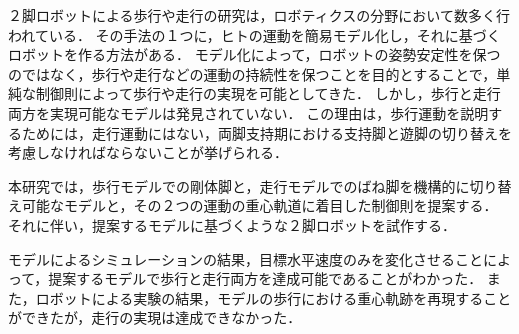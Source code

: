 ２脚ロボットによる歩行や走行の研究は，ロボティクスの分野において数多く行われている．
その手法の１つに，ヒトの運動を簡易モデル化し，それに基づくロボットを作る方法がある．
モデル化によって，ロボットの姿勢安定性を保つのではなく，歩行や走行などの運動の持続性を保つことを目的とすることで，単純な制御則によって歩行や走行の実現を可能としてきた．
しかし，歩行と走行両方を実現可能なモデルは発見されていない．
この理由は，歩行運動を説明するためには，走行運動にはない，両脚支持期における支持脚と遊脚の切り替えを考慮しなければならないことが挙げられる．

本研究では，歩行モデルでの剛体脚と，走行モデルでのばね脚を機構的に切り替え可能なモデルと，その２つの運動の重心軌道に着目した制御則を提案する．
それに伴い，提案するモデルに基づくような２脚ロボットを試作する．


モデルによるシミュレーションの結果，目標水平速度のみを変化させることによって，提案するモデルで歩行と走行両方を達成可能であることがわかった．
また，ロボットによる実験の結果，モデルの歩行における重心軌跡を再現することができたが，走行の実現は達成できなかった．
